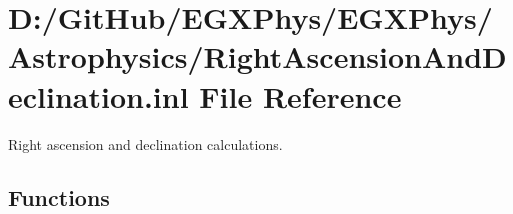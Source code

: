 \hypertarget{_right_ascension_and_declination_8inl}{}\section{D\+:/\+Git\+Hub/\+E\+G\+X\+Phys/\+E\+G\+X\+Phys/\+Astrophysics/\+Right\+Ascension\+And\+Declination.inl File Reference}
\label{_right_ascension_and_declination_8inl}


Right ascension and declination calculations.  


\subsection*{Functions}
